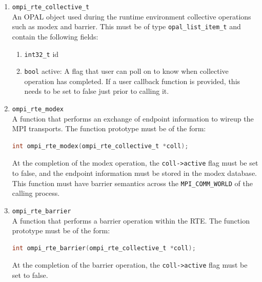 \begin{enumerate}
\item \verb|ompi_rte_collective_t|\\
  An OPAL object used during the runtime environment collective operations such as modex and barrier. This must be of type \verb|opal_list_item_t| and contain the following fields:
  
  \begin{enumerate}
  \item \verb|int32_t| id
  \item \verb|bool| active: A flag that user can poll on to know when collective operation has completed. If a user callback function is provided, this needs to be set to false just prior to calling it.
  \end{enumerate}

\item \verb|ompi_rte_modex|\\
  A function that performs an exchange of endpoint information to wireup the MPI transports. The function prototype must be of the form:
  \begin{lstlisting}[language=C]
  int ompi_rte_modex(ompi_rte_collective_t *coll);
  \end{lstlisting}
  At the completion of the modex operation, the \verb|coll->active| flag must be set to false, and the endpoint information must be stored in the modex database.
  This function must have barrier semantics across the \verb|MPI_COMM_WORLD| of the calling process.

\item \verb|ompi_rte_barrier|\\
  A function that performs a barrier operation within the RTE. The function prototype must be of the form:
  \begin{lstlisting}[language=C]
  int ompi_rte_barrier(ompi_rte_collective_t *coll);
  \end{lstlisting}
  At the completion of the barrier operation, the \verb|coll->active| flag must be set to false.
\end{enumerate}



